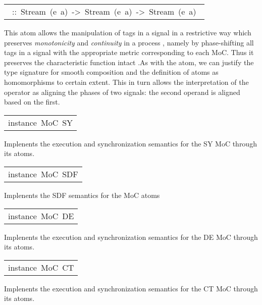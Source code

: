 \begin{haddockdesc}
\begin{haddockdesc}
\item[\begin{tabular}{@{}l}\haddockid{(-\&-)}\ ::\ Stream\ (e\ a)\ ->\ Stream\ (e\ a)\ ->\ Stream\ (e\ a)\ \end{tabular}]
\haddockbegindoc
This atom allows the manipulation of tags in a signal in a restrictive way which preserves \emph{monotonicity} and \emph{continuity} in a process  \cite{Lee98}, namely by phase-shifting all tags in a signal with the appropriate metric corresponding to each MoC. Thus it preserves the characteristic function intact  \cite{Sander04}.As with the \haddockid{-<-} atom, we can justify the type signature for smooth composition and the definition of atoms as homomorphisms to certain extent. This in turn allows the interpretation of the  operator as aligning the phases of two signals: the second operand is aligned based on the first.\par

\end{haddockdesc}


\item[\begin{tabular}{@{}l}
instance\ MoC\ SY
\end{tabular}]\haddockbegindoc
Implenents the execution and synchronization semantics for the SY
 MoC through its atoms.\par


\item[\begin{tabular}{@{}l}
instance\ MoC\ SDF
\end{tabular}]\haddockbegindoc
Implenents the SDF semantics for the MoC atoms\par


\item[\begin{tabular}{@{}l}
instance\ MoC\ DE
\end{tabular}]\haddockbegindoc
Implenents the execution and synchronization semantics for the DE
 MoC through its atoms.\par


\item[\begin{tabular}{@{}l}
instance\ MoC\ CT
\end{tabular}]\haddockbegindoc
Implenents the execution and synchronization semantics for the CT
 MoC through its atoms.\par

\end{haddockdesc}
